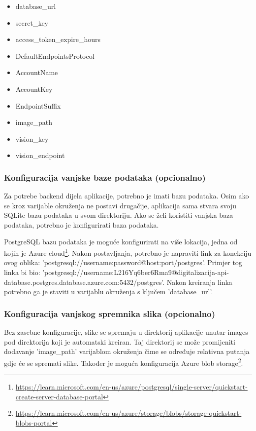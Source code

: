			\begin{itemize}
				\item{database\_url}
				\item{secret\_key}
				\item{access\_token\_expire\_hours}
				\item{DefaultEndpointsProtocol}
				\item{AccountName}
				\item{AccountKey}
				\item{EndpointSuffix}
				\item{image\_path}
				\item{vision\_key}
				\item{vision\_endpoint}
			\end{itemize}
			
			\subsubsection{Konfiguracija vanjske baze podataka (opcionalno)}
			
			{Za potrebe backend dijela aplikacije, potrebno je imati bazu podataka. Osim ako se kroz varijable okruženja ne postavi drugačije, aplikacija sama stvara svoju SQLite bazu podataka u svom direktoriju. Ako se želi koristiti vanjska baza podataka, potrebno je konfigurirati baza podataka.}
			
			{PostgreSQL bazu podataka je moguće konfigurirati na više lokacija, jedna od kojih je Azure cloud\footnote{\url{https://learn.microsoft.com/en-us/azure/postgresql/single-server/quickstart-create-server-database-portal}}. Nakon postavljanja, potrebno je napraviti link za konekciju ovog oblika: 'postgresql://{username}:{password}@{host}:{port}/postgres'. Primjer tog linka bi bio: 'postgresql://username:L216Yq6ber6Rma9@digitalizacija-api-database.postgres.database.azure.com:5432/postgres'. Nakon kreiranja linka potrebno ga je staviti u varijablu okruženja s ključem 'database\_url'.}
			
			
			\subsubsection{Konfiguracija vanjskog spremnika slika (opcionalno)}
			
			{Bez zasebne konfiguracije, slike se spremaju u direktorij aplikacije unutar images pod direktorija koji je automatski kreiran. Taj direktorij se može promijeniti dodavanje 'image\_path' varijablom okruženja čime se određuje relativna putanja gdje će se spremati slike. Također je moguća konfiguracija Azure blob storage\footnote{\url{https://learn.microsoft.com/en-us/azure/storage/blobs/storage-quickstart-blobs-portal}}.}
			
